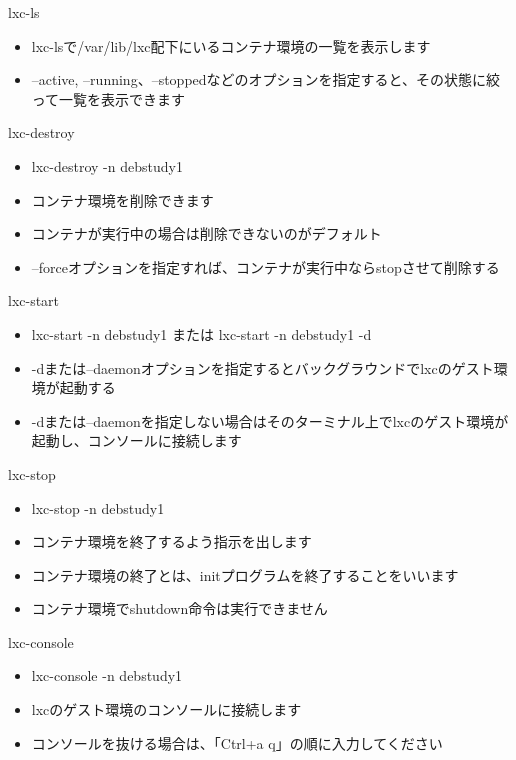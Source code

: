\begin{frame}[containsverbatim]{lxc-ls}
  \begin{itemize}
  \item lxc-lsで/var/lib/lxc配下にいるコンテナ環境の一覧を表示します
  \item --active, --running、--stoppedなどのオプションを指定すると、その状態に絞って一覧を表示できます
  \end{itemize}
\end{frame}

\begin{frame}[containsverbatim]{lxc-destroy}
  \begin{itemize}
  \item lxc-destroy -n debstudy1
  \item コンテナ環境を削除できます
  \item コンテナが実行中の場合は削除できないのがデフォルト
  \item --forceオプションを指定すれば、コンテナが実行中ならstopさせて削除する
  \end{itemize}
\end{frame}

\begin{frame}[containsverbatim]{lxc-start}
  \begin{itemize}
  \item lxc-start -n debstudy1 または lxc-start -n debstudy1 -d
  \item -dまたは--daemonオプションを指定するとバックグラウンドでlxcのゲスト環境が起動する
  \item -dまたは--daemonを指定しない場合はそのターミナル上でlxcのゲスト環境が起動し、コンソールに接続します
  \end{itemize}
\end{frame}

\begin{frame}[containsverbatim]{lxc-stop}
  \begin{itemize}
  \item lxc-stop -n debstudy1
  \item コンテナ環境を終了するよう指示を出します
  \item コンテナ環境の終了とは、initプログラムを終了することをいいます
  \item コンテナ環境でshutdown命令は実行できません
  \end{itemize}
\end{frame}

\begin{frame}[containsverbatim]{lxc-console}
  \begin{itemize}
  \item lxc-console -n debstudy1
  \item lxcのゲスト環境のコンソールに接続します
  \item コンソールを抜ける場合は、「Ctrl+a q」の順に入力してください
  \end{itemize}
\end{frame}


